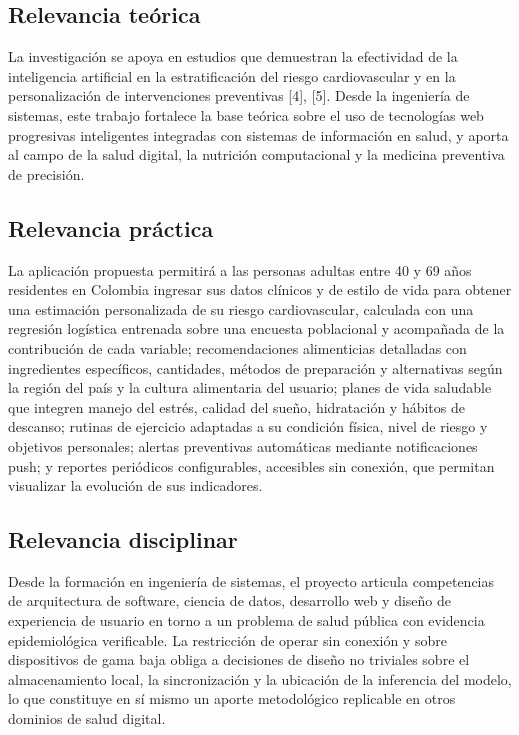 \documentclass[conference]{IEEEtran}
\begin{document}
\subsection{Relevancia teórica}
La investigación se apoya en estudios que demuestran la efectividad de la inteligencia artificial en la estratificación del riesgo cardiovascular y en la personalización de intervenciones preventivas [4], [5]. Desde la ingeniería de sistemas, este trabajo fortalece la base teórica sobre el uso de tecnologías web progresivas inteligentes integradas con sistemas de información en salud, y aporta al campo de la salud digital, la nutrición computacional y la medicina preventiva de precisión.

\subsection{Relevancia práctica}
La aplicación propuesta permitirá a las personas adultas entre 40 y 69 años residentes en Colombia ingresar sus datos clínicos y de estilo de vida para obtener una estimación personalizada de su riesgo cardiovascular, calculada con una regresión logística entrenada sobre una encuesta poblacional y acompañada de la contribución de cada variable; recomendaciones alimenticias detalladas con ingredientes específicos, cantidades, métodos de preparación y alternativas según la región del país y la cultura alimentaria del usuario; planes de vida saludable que integren manejo del estrés, calidad del sueño, hidratación y hábitos de descanso; rutinas de ejercicio adaptadas a su condición física, nivel de riesgo y objetivos personales; alertas preventivas automáticas mediante notificaciones push; y reportes periódicos configurables, accesibles sin conexión, que permitan visualizar la evolución de sus indicadores.

\subsection{Relevancia disciplinar}
Desde la formación en ingeniería de sistemas, el proyecto articula competencias de arquitectura de software, ciencia de datos, desarrollo web y diseño de experiencia de usuario en torno a un problema de salud pública con evidencia epidemiológica verificable. La restricción de operar sin conexión y sobre dispositivos de gama baja obliga a decisiones de diseño no triviales sobre el almacenamiento local, la sincronización y la ubicación de la inferencia del modelo, lo que constituye en sí mismo un aporte metodológico replicable en otros dominios de salud digital.
\end{document}
